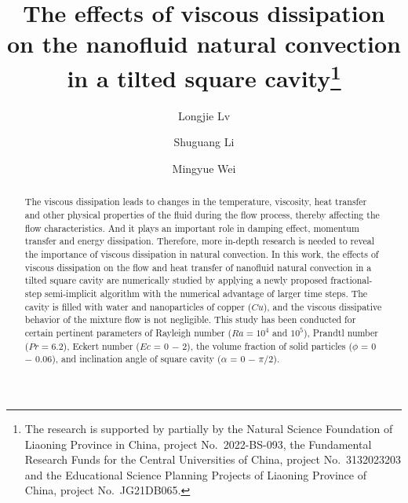 \documentclass[12pt]{llncs}
\begin{document}
\fi
%
\title{The effects of viscous dissipation on the nanofluid natural convection in a tilted square cavity\thanks{The research is supported by partially by the  Natural Science Foundation of Liaoning Province in China, project No.~2022-BS-093, the  Fundamental Research Funds for the Central Universities of China, project No.~3132023203 and  the Educational Science Planning Projects of Liaoning Province of China, project No.~JG21DB065. }}
\author{Longjie Lv \and Shuguang Li \and  Mingyue Wei
}

\maketitle

\begin{abstract}
The viscous dissipation  leads to changes in the temperature, viscosity, heat transfer and other physical properties of the fluid during the flow process, thereby affecting the flow characteristics.
And it plays an important role in damping effect, momentum transfer and energy dissipation. Therefore, more in-depth research is needed to reveal the importance of viscous dissipation in natural convection.
In this work, the effects of viscous dissipation on the flow and heat transfer of nanofluid natural convection in a tilted square cavity are numerically studied by applying a newly proposed fractional-step semi-implicit algorithm with the numerical advantage of larger time steps. The cavity is filled with water and nanoparticles of copper ($Cu$), and the viscous dissipative behavior of the mixture flow is not negligible. This study has been conducted for certain pertinent parameters of Rayleigh number ($Ra = 10^{4}$ and $10^{5}$), Prandtl number ($Pr = 6.2$), Eckert number ($Ec$ = 0 $-$ 2), the volume fraction of solid particles ($\phi$ = 0 $-$ 0.06), and inclination angle of square cavity ($\alpha$ = 0 $-$ $\pi/2$).
\end{abstract}
\end{document}
